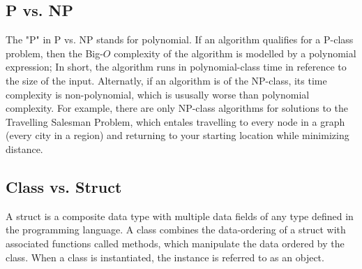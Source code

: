 \documentclass[12pt]{article}
\begin{document}
	\subsection{P vs. NP}
	The "P" in P vs. NP stands for polynomial. If an algorithm qualifies for a P-class problem, then the Big-$O$ complexity of the algorithm is modelled by a polynomial expression; In short, the algorithm runs in polynomial-class time in reference to the size of the input. Alternatly, if an algorithm is of the NP-class, its time complexity is non-polynomial, which is ususally worse than polynomial complexity. For example, there are only NP-class algorithms for solutions to the Travelling Salesman Problem, which entales travelling to every node in a graph (every city in a region) and returning to your starting location while minimizing distance.

	\subsection{Class vs. Struct}
	A struct is a composite data type with multiple data fields of any type defined in the programming language. A class combines the data-ordering of a struct with associated functions called methods, which manipulate the data ordered by the class. When a class is instantiated, the instance is referred to as an object.
\end{document}
